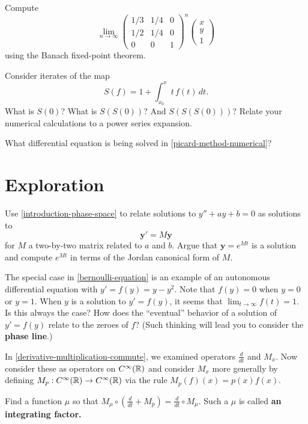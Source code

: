\documentclass{homework}
\begin{document}
\begin{problem}
  Compute
  \[
    \lim_{n \to \infty} \begin{pmatrix} 1/3 & 1/4 & 0 \\ 1/2 & 1/4 & 0 \\ 0 & 0 & 1 \end{pmatrix}^n \begin{pmatrix} x \\ y \\ 1 \end{pmatrix}
  \]
  using the Banach fixed-point theorem.
\end{problem}

\begin{problem}\label{picard-method-numerical}Consider iterates of the map
  \[
    S(f) = 1 + \int_{x_0}^x t \, f(t) \, dt.
  \]
  What is $S(0)$?  What is $S(S(0))$?  And $S(S(S(0)))$?  Relate your numerical calculations to a power series expansion.
\end{problem}

\begin{problem}
  What differential equation is being solved in \ref{picard-method-numerical}?
\end{problem}

\section{Exploration}

\begin{problem}
  Use \ref{introduction-phase-space} to relate solutions to $y'' + ay + b = 0$ as solutions to
  \[
    \mathbf{y}' = M\mathbf{y}
  \]
  for $M$ a two-by-two matrix related to $a$ and $b$.  Argue that $\mathbf{y} = e^{Mt}$ is a solution and compute $e^{Mt}$ in terms of the Jordan canonical form of $M$.
\end{problem}

\begin{problem}
  The special case in \ref{bernoulli-equation} is an example of an
  autonomous differential equation with $y' = f(y) = y - y^2$.  Note
  that $f(y) = 0$ when $y = 0$ or $y = 1$.  When $y$ is a solution to
  $y' = f(y)$, it seems that $\lim_{t \to \infty} f(t) = 1$.  Is this
  always the case?  How does the ``eventual'' behavior of a solution
  of $y' = f(y)$ relate to the zeroes of $f$?  (Such thinking will
  lead you to consider the \textbf{phase line}.)
\end{problem}

\begin{problem}\label{integrating-factor}In \ref{derivative-multiplication-commute}, we examined operators $\frac{d}{dt}$ and $M_x$.  Now consider these as operators on $C^\infty(\mathbb{R})$ and consider $M_x$ more generally by defining $M_p : C^\infty(\mathbb{R}) \to C^\infty(\mathbb{R})$ via the rule $M_p(f)(x) = p(x) f(x)$.

  Find a function $\mu$ so that \(
    M_\mu \circ (\displaystyle\frac{d}{dt} + M_p) = \displaystyle\frac{d}{dt} \circ M_\mu.
  \)
  Such a $\mu$ is called \textbf{an integrating factor.}
\end{problem}
\end{document}
